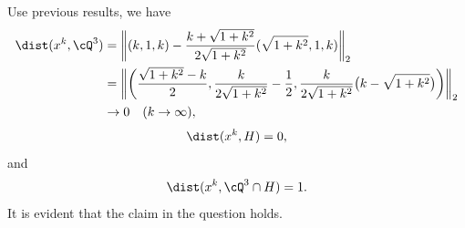 \subsection{} %

Use previous results,
we have
\begin{equation}
\begin{split}
    \dist(x^k, \cQ^3)
        &= \bigg\|(k,1,k)-\frac{k+\sqrt{1+k^2}}{2\sqrt{1+k^2}}(\sqrt{1+k^2},1,k)\bigg\|_2 \\
        &= \bigg\|\bigg( \frac{\sqrt{1+k^2}-k}{2},\frac{k}{2\sqrt{1+k^2}}-\frac{1}{2},\frac{k}{2\sqrt{1+k^2}}\big(k-\sqrt{1+k^2}\big) \bigg)\bigg\|_2 \\
        &\rightarrow 0\quad(k\rightarrow\infty),
\end{split}
\end{equation}
\begin{equation}
    \dist(x^k, H) = 0,
\end{equation}
and
\begin{equation}
    \dist(x^k, \cQ^3\cap H) = 1.
\end{equation}
It is evident that the claim in the question holds.

